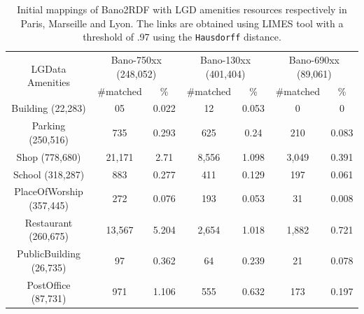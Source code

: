 \begin{table}[ht!b]
  \begin{tabular}{|c|c|c|c|c|c|c|}
            \cline{1-7}
           \multirow{2}{*}{LGData Amenities}  & \multicolumn{2}{|p{2cm}|}{Bano-750xx (248,052)} & \multicolumn{2}{|p{2cm}|}{Bano-130xx (401,404)} & \multicolumn{2}{|p{2cm}|}{Bano-690xx (89,061)}\\
            \cline{2-7}
             & \#matched & \% & \#matched & \% & \#matched & \% \\
            \hline
            \multicolumn{1}{|p{2cm}|}{Building (22,283)} & 05& 0.022 & 12 & 0.053 & 0 & 0  \\
            \hline
            \multicolumn{1}{|p{2cm}|}{Parking (250,516)} & 735 & 0.293 & 625 & 0.24 & 210 & 0.083  \\
            \hline
            \multicolumn{1}{|p{2cm}|}{Shop (778,680)} & 21,171 & 2.71 & 8,556 & 1.098 & 3,049 & 0.391  \\
            \hline
            \multicolumn{1}{|p{2cm}|}{School (318,287)} & 883 & 0.277 & 411 & 0.129 & 197 & 0.061  \\
            \hline
            \multicolumn{1}{|p{2cm}|}{PlaceOfWorship (357,445)} & 272 & 0.076 & 193 & 0.053 & 31 & 0.008  \\
            \hline
            \multicolumn{1}{|p{2cm}|}{Restaurant (260,675)} & 13,567 & 5.204 & 2,654 & 1.018 & 1,882 & 0.721  \\
            \hline
            \multicolumn{1}{|p{2cm}|}{PublicBuilding (26,735)} & 97 & 0.362 & 64 & 0.239 & 21 & 0.078  \\
            \hline
            \multicolumn{1}{|p{2cm}|}{PostOffice (87,731)} & 971 & 1.106 & 555 & 0.632 & 173 & 0.197  \\
            \hline
        \end{tabular}
  \caption{Initial mappings of Bano2RDF with LGD amenities resources respectively in Paris, Marseille and Lyon. The links are obtained using LIMES tool with a threshold of .97 using the \texttt{Hausdorff} distance.}
  \label{tab:bano-gld}
\end{table}

